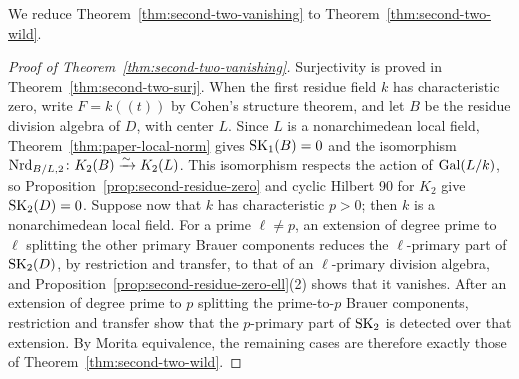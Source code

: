 We reduce Theorem~\ref{thm:second-two-vanishing} to Theorem~\ref{thm:second-two-wild}.

\begin{proof}[Proof of Theorem~\ref{thm:second-two-vanishing}]
Surjectivity is proved in Theorem~\ref{thm:second-two-surj}.
When the first residue field $k$ has characteristic zero, write $F=k((t))$ by Cohen's structure theorem, and let $B$ be the residue division algebra of $D$, with center $L$.
Since $L$ is a nonarchimedean local field, Theorem~\ref{thm:paper-local-norm} gives $\operatorname{SK}_1(B)=0$ and the isomorphism $\operatorname{Nrd}_{B/L,2}\colon K_2(B)\xrightarrow{\sim}K_2(L)$.
This isomorphism respects the action of $\operatorname{Gal}(L/k)$, so Proposition~\ref{prop:second-residue-zero} and cyclic Hilbert 90 for $K_2$ \cite[Theorem 14.1]{MerkurjevSuslin1982} give $\operatorname{SK}_2(D)=0$.
Suppose now that $k$ has characteristic $p>0$; then $k$ is a nonarchimedean local field.
For a prime $\ell\ne p$, an extension of degree prime to $\ell$ splitting the other primary Brauer components reduces the $\ell$-primary part of $\operatorname{SK}_2(D)$, by restriction and transfer, to that of an $\ell$-primary division algebra, and Proposition~\ref{prop:second-residue-zero-ell}(2) shows that it vanishes.
After an extension of degree prime to $p$ splitting the prime-to-$p$ Brauer components, restriction and transfer show that the $p$-primary part of $\operatorname{SK}_2$ is detected over that extension.
By Morita equivalence, the remaining cases are therefore exactly those of Theorem~\ref{thm:second-two-wild}.
\end{proof}
